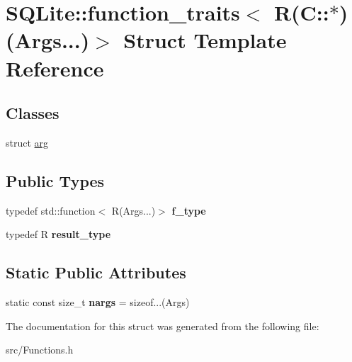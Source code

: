 \hypertarget{struct_s_q_lite_1_1function__traits_3_01_r_07_c_1_1_5_08_07_args_8_8_8_08_4}{\section{S\-Q\-Lite\-:\-:function\-\_\-traits$<$ R(C\-:\-:$\ast$)(Args...)$>$ Struct Template Reference}
\label{struct_s_q_lite_1_1function__traits_3_01_r_07_c_1_1_5_08_07_args_8_8_8_08_4}
}
\subsection*{Classes}
\begin{DoxyCompactItemize}
\item 
struct \hyperlink{struct_s_q_lite_1_1function__traits_3_01_r_07_c_1_1_5_08_07_args_8_8_8_08_4_1_1arg}{arg}
\end{DoxyCompactItemize}
\subsection*{Public Types}
\begin{DoxyCompactItemize}
\item 
\hypertarget{struct_s_q_lite_1_1function__traits_3_01_r_07_c_1_1_5_08_07_args_8_8_8_08_4_a672d67d6e5525c90ed5b4c28e4f2514c}{typedef std\-::function$<$ R(Args...)$>$ {\bfseries f\-\_\-type}}\label{struct_s_q_lite_1_1function__traits_3_01_r_07_c_1_1_5_08_07_args_8_8_8_08_4_a672d67d6e5525c90ed5b4c28e4f2514c}

\item 
\hypertarget{struct_s_q_lite_1_1function__traits_3_01_r_07_c_1_1_5_08_07_args_8_8_8_08_4_ae15055764604ef8c9693d73f28f018e6}{typedef R {\bfseries result\-\_\-type}}\label{struct_s_q_lite_1_1function__traits_3_01_r_07_c_1_1_5_08_07_args_8_8_8_08_4_ae15055764604ef8c9693d73f28f018e6}

\end{DoxyCompactItemize}
\subsection*{Static Public Attributes}
\begin{DoxyCompactItemize}
\item 
\hypertarget{struct_s_q_lite_1_1function__traits_3_01_r_07_c_1_1_5_08_07_args_8_8_8_08_4_aa14cf5fc72021d00d74eec8b1da2c6c2}{static const size\-\_\-t {\bfseries nargs} = sizeof...(Args)}\label{struct_s_q_lite_1_1function__traits_3_01_r_07_c_1_1_5_08_07_args_8_8_8_08_4_aa14cf5fc72021d00d74eec8b1da2c6c2}

\end{DoxyCompactItemize}


The documentation for this struct was generated from the following file\-:\begin{DoxyCompactItemize}
\item 
src/Functions.\-h\end{DoxyCompactItemize}
